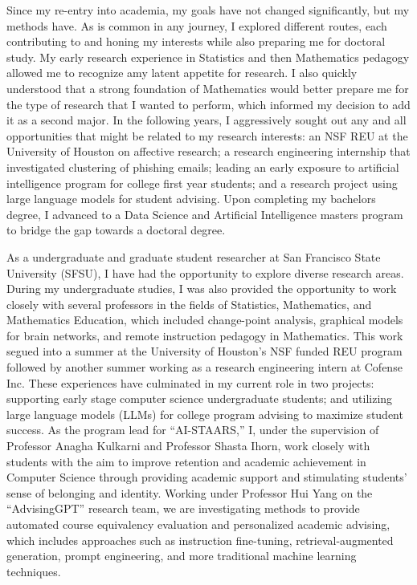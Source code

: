 \documentclass[12pt]{article}
\begin{document}
Since my re-entry into academia, my goals have not changed significantly, but my methods have. As is common in any journey, I explored
different routes, each contributing to and honing my interests while also preparing me for doctoral study. My early research experience in
Statistics and then Mathematics pedagogy allowed me to recognize amy latent appetite for research. I also quickly understood that a strong
foundation of Mathematics would better prepare me for the type of research that I wanted to perform, which informed my decision to add it
as a second major. In the following years, I aggressively sought out any and all opportunities that might be related to my research
interests: an NSF REU at the University of Houston on affective research; a research engineering internship that investigated clustering of
phishing emails; leading an early exposure to artificial intelligence program for college first year students; and a research project using
large language models for student advising. Upon completing my bachelors degree, I advanced to a Data Science and Artificial Intelligence
masters program to bridge the gap towards a doctoral degree.

As a undergraduate and graduate student researcher at San Francisco State University (SFSU), I have had the opportunity to explore diverse
research areas. During my undergraduate studies, I was also provided the opportunity to work closely with several professors in the fields
of Statistics, Mathematics, and Mathematics Education, which included change-point analysis, graphical models for brain networks, and
remote instruction pedagogy in Mathematics. This work segued into a summer at the University of Houston's NSF funded REU program followed
by another summer working as a research engineering intern at Cofense Inc. These experiences have culminated in my current role in two
projects: supporting early stage computer science undergraduate students; and utilizing large language models (LLMs) for college program
advising to maximize student success. As the program lead for ``AI-STAARS,'' I, under the supervision of Professor Anagha Kulkarni and
Professor Shasta Ihorn, work closely with students with the aim to improve retention and academic achievement in Computer Science through
providing academic support and stimulating students' sense of belonging and identity. Working under Professor Hui Yang on the
``AdvisingGPT'' research team, we are investigating methods to provide automated course equivalency evaluation and personalized academic
advising, which includes approaches such as instruction fine-tuning, retrieval-augmented generation, prompt engineering, and more
traditional machine learning techniques.
\end{document}
